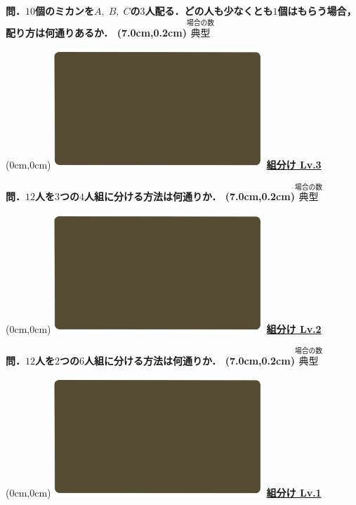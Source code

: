 \documentclass[10pt,
fleqn,
dvipdfmx,
uplatex
]{jsarticle}
\begin{document}
\LARGE 
\bf\boldmath 問．${10}$個のミカンを$A,\;B,\;C$の$3$人配る．どの人も少なくとも$1$個はもらう場合，配り方は何通りあるか．
\at(7.0cm,0.2cm){\small\color{bradorange}$\overset{\text{場合の数}}{\text{典型}}$}


\newpage



\at(0cm,0cm){\includegraphics[width=8cm,bb=0 0 1920 1080]{./youtube/thumbnails/templates/smart_background/場合の数.jpeg}}
{\color{orange}\bf\boldmath\huge\underline{組分け Lv.3 }}\vspace{0.3zw}

\huge 
\bf\boldmath 問．${12}$人を$3$つの$4$人組に分ける方法は何通りか．
\at(7.0cm,0.2cm){\small\color{bradorange}$\overset{\text{場合の数}}{\text{典型}}$}


\newpage



\at(0cm,0cm){\includegraphics[width=8cm,bb=0 0 1920 1080]{./youtube/thumbnails/templates/smart_background/場合の数.jpeg}}
{\color{orange}\bf\boldmath\huge\underline{組分け Lv.2 }}\vspace{0.3zw}

\huge 
\bf\boldmath 問．${12}$人を$2$つの$6$人組に分ける方法は何通りか．
\at(7.0cm,0.2cm){\small\color{bradorange}$\overset{\text{場合の数}}{\text{典型}}$}


\newpage



\at(0cm,0cm){\includegraphics[width=8cm,bb=0 0 1920 1080]{./youtube/thumbnails/templates/smart_background/場合の数.jpeg}}
{\color{orange}\bf\boldmath\huge\underline{組分け Lv.1 }}\vspace{0.3zw}
\end{document}
